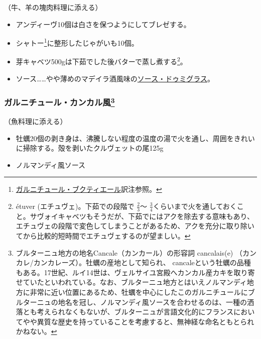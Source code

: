 \begin{recette}
（牛、羊の塊肉料理に添える）

\begin{itemize}
\item
  アンディーヴ10個は白さを保つようにしてブレゼする。
\item
  シャトー\footnote{\protect\hyperlink{garniture-bouquetiere}{ガルニチュール・ブクティエール}訳注参照。}に整形したじゃがいも10個。
\item
  芽キャベツ500gは下茹でした後バターで蒸し煮する\footnote{étuver
    (エチュヴェ)。下茹での段階で \(\frac{2}{3}\)〜
    \(\frac{3}{4}\)くらいまで火を通しておくこと。サヴォイキャベツもそうだが、下茹でにはアクを除去する意味もあり、エチュヴェの段階で変色してしまうことがあるため、アクを充分に取り除いてから比較的短時間でエチュヴェするのが望ましい。}。
\item
  ソース\ldots{}\ldots{}やや薄めのマデイラ酒風味の\protect\hyperlink{sauce-demi-glace}{ソース・ドゥミグラス}。
\end{itemize}

\hypertarget{garniture-cancalaise}{%
\subsubsection[ガルニチュール・カンカル風]{\texorpdfstring{ガルニチュール・カンカル風\footnote{ブルターニュ地方の地名Cancale（カンカール）の形容詞
  cancalais(e) （カンカレ/カンカレーズ）。牡蠣の産地として知られ、
  cancaleという牡蠣の品種もある。17世紀、ルイ14世は、ヴェルサイユ宮殿へカンカル産カキを取り寄せていたといわれている。なお、ブルターニュ地方とはいえノルマンディ地方に非常に近い位置にあるため、牡蠣を中心にしたこのガルニチュールにブルターニュの地名を冠し、ノルマンディ風ソースを合わせるのは、一種の洒落とも考えられなくもないが、ブルターニュが言語文化的にフランスにおいてやや異質な歴史を持っていることを考慮すると、無神経な命名ともとられかねない。}}{ガルニチュール・カンカル風}}\label{garniture-cancalaise}}



（魚料理に添える）

\begin{itemize}
\item
  牡蠣20個の剥き身は、沸騰しない程度の温度の湯で火を通し、周囲をきれいに掃除する。殻を剥いたクルヴェットの尾125g
\item
  ノルマンディ風ソース
\end{itemize}


\end{recette}
